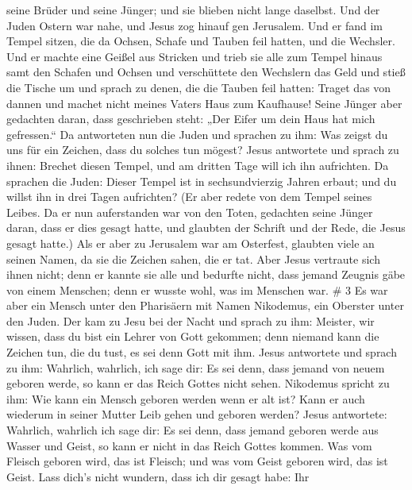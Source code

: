 seine Brüder und seine Jünger; und sie blieben nicht lange daselbst.
 Und der Juden Ostern war nahe, und Jesus zog hinauf gen
Jerusalem.  Und er fand im Tempel sitzen, die da Ochsen,
Schafe und Tauben feil hatten, und die Wechsler.  Und er
machte eine Geißel aus Stricken und trieb sie alle zum Tempel hinaus
samt den Schafen und Ochsen und verschüttete den Wechslern das Geld und
stieß die Tische um  und sprach zu denen, die die Tauben
feil hatten: Traget das von dannen und machet nicht meines Vaters Haus
zum Kaufhause!  Seine Jünger aber gedachten daran, dass
geschrieben steht: „Der Eifer um dein Haus hat mich gefressen.``
 Da antworteten nun die Juden und sprachen zu ihm: Was
zeigst du uns für ein Zeichen, dass du solches tun mögest? 
Jesus antwortete und sprach zu ihnen: Brechet diesen Tempel, und am
dritten Tage will ich ihn aufrichten.  Da sprachen die
Juden: Dieser Tempel ist in sechsundvierzig Jahren erbaut; und du willst
ihn in drei Tagen aufrichten?  (Er aber redete von dem
Tempel seines Leibes.  Da er nun auferstanden war von den
Toten, gedachten seine Jünger daran, dass er dies gesagt hatte, und
glaubten der Schrift und der Rede, die Jesus gesagt hatte.)
 Als er aber zu Jerusalem war am Osterfest, glaubten viele
an seinen Namen, da sie die Zeichen sahen, die er tat. 
Aber Jesus vertraute sich ihnen nicht; denn er kannte sie alle
 und bedurfte nicht, dass jemand Zeugnis gäbe von einem
Menschen; denn er wusste wohl, was im Menschen war. \# 3  Es
war aber ein Mensch unter den Pharisäern mit Namen Nikodemus, ein
Oberster unter den Juden.  Der kam zu Jesu bei der Nacht und
sprach zu ihm: Meister, wir wissen, dass du bist ein Lehrer von Gott
gekommen; denn niemand kann die Zeichen tun, die du tust, es sei denn
Gott mit ihm.  Jesus antwortete und sprach zu ihm: Wahrlich,
wahrlich, ich sage dir: Es sei denn, dass jemand von neuem geboren
werde, so kann er das Reich Gottes nicht sehen.  Nikodemus
spricht zu ihm: Wie kann ein Mensch geboren werden wenn er alt ist? Kann
er auch wiederum in seiner Mutter Leib gehen und geboren werden?
 Jesus antwortete: Wahrlich, wahrlich ich sage dir: Es sei
denn, dass jemand geboren werde aus Wasser und Geist, so kann er nicht
in das Reich Gottes kommen.  Was vom Fleisch geboren wird,
das ist Fleisch; und was vom Geist geboren wird, das ist Geist.
 Lass dich's nicht wundern, dass ich dir gesagt habe: Ihr
